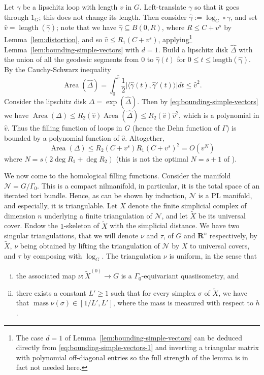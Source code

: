 \documentclass[12pt]{amsart}
\theoremstyle{definition}
\begin{document}
Let $\gamma$ be a lipschitz loop with length $v$ in $G$. 
Left-translate $\gamma$ so that it goes through $1_G$; this does not change its length. 
Then consider $\widehat \gamma := \log_G \circ \gamma$, and set $\widehat v = \operatorname{length}(\widehat \gamma)$; note that we have $\widehat \gamma \subseteq B(0,R)$, where $R \leqslant C + v^s$ by Lemma~\ref{lem:distortion}, and so $\widehat v \leqslant R_1(C+v^s)$, applying\footnote{The case $d=1$ of Lemma~\ref{lem:bounding-simple-vectors} can be deduced directly from \eqref{eq:bounding-simple-vectors-1} and inverting a triangular matrix with polynomial off-diagonal entries so the full strength of the lemma is in fact not needed here.} Lemma~\ref{lem:bounding-simple-vectors} with $d=1$. Build a lipschitz disk $\widehat \Delta$ with the union of all the geodesic segments from $0$ to $\widehat \gamma(t)$ for $0 \leqslant t \leqslant \operatorname{length(\widehat \gamma)}$. By the Cauchy-Schwarz inequality
\[ \operatorname{Area}(\widehat \Delta) = \int_0^{\widehat v} \frac{1}{2}  \vert\langle \widehat \gamma(t), \widehat \gamma'(t) \rangle \vert dt \leqslant \widehat v^2. \]
Consider the lipschitz disk $\Delta = \exp(\widehat \Delta)$.
Then by \eqref{eq:bounding-simple-vectors} we have $\operatorname{Area}(\Delta) \leqslant R_2(\widehat v) \operatorname{Area}(\widehat \Delta) \leqslant R_2(\widehat v)\widehat v^2$, which is a polynomial in $\widehat v$. Thus the filling function of loops in
$G$ (hence the Dehn function of $\Gamma$) is bounded by a polynomial function of $\widehat v$. Altogether,
\begin{equation*}
    \operatorname{Area}(\Delta) \leqslant R_2(C+v^s)R_1(C+v^s)^2 = O(v^N)
\end{equation*}
where $N = s \left( 2 \deg  R_1 +\deg R_2 \right)$ (this is not the optimal $N = s+1$ of \cite{GHR}).



We now come to the homological filling functions.
Consider the manifold $\mathcal N = G/\Gamma_0$. This is a compact nilmanifold, in particular, it is the total space of an iterated tori bundle. Hence, as can be shown by induction, $\mathcal N$ is a PL manifold, and especially, it is triangulable. Let $X$ denote the finite simplicial complex of dimension $n$ underlying a finite triangulation of $\mathcal N$, and let $\widetilde X$ be its universal cover.
Endow the $1$-skeleton of $\widetilde X$ with the simplicial distance.
We have two singular triangulations, that we will denote $\nu$ and $\tau$, of $G$ and $\mathbf R^n$ respectively, by $\widetilde X$, $\nu$ being obtained by lifting the triangulation of $\mathcal N$ by $X$ to universal covers, and $\tau$ by composing with $\log_G$.
The triangulation $\nu$ is uniform, in the sense that
\begin{enumerate}[(i)]
    \item the associated map $\nu:\widetilde X^{(0)} \to G$ is a $\Gamma_0$-equivariant quasiisometry, and
    \item there exists a constant $L' \geqslant 1$ such that for every simplex $\sigma$ of $\widetilde X$, we have that $\operatorname{mass} \nu(\sigma) \in [1/L', L']$, where the mass is measured with respect to $h$.
\end{enumerate}
\end{document}
